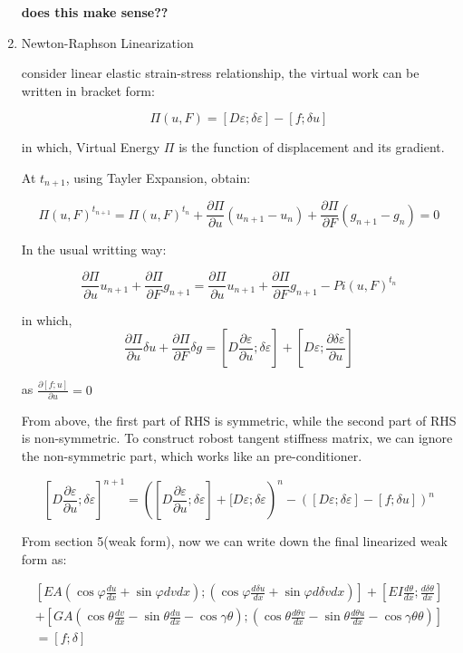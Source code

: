 \documentclass[11pt]{article}
\begin{document}
\begin{enumerate}
\textbf{does this make sense??}
 
\item{Newton-Raphson Linearization} 

consider linear elastic strain-stress relationship, the virtual work can be written in bracket form:

$$ \Pi(u,F) = [D \varepsilon; \delta \varepsilon] - [f; \delta u] $$

in which, Virtual Energy $\Pi$ is the function of displacement and its gradient. 

At $t_{n+1}$, using Tayler Expansion, obtain:

$$\Pi(u,F)^{t_{n+1}} = \Pi(u,F)^{t_n} + \frac {\partial \Pi}{\partial u} (u_{n+1} - u_n)  + \frac {\partial \Pi}{\partial F} ( g_{n+1} - g_n) = 0 $$

In the usual  writting way:

$$\frac {\partial \Pi}{\partial u} u_{n+1}  + \frac {\partial \Pi}{\partial F} g_{n+1} = \frac {\partial \Pi}{\partial u} u_{n+1}  + \frac {\partial \Pi}{\partial F} g_{n+1} - Pi(u,F)^{t_n} $$

in which, 
$$ \frac{\partial \Pi}{\partial u} \delta u +   \frac {\partial \Pi}{\partial F} \delta  g = [D \frac{\partial \varepsilon}{\partial u}; \delta \varepsilon] + [D \varepsilon; \frac{\partial \delta \varepsilon}{\partial u}] $$

as $\frac{\partial[f;u]}{\partial u} = 0 $

From above, the first part of RHS is symmetric, while the second part of RHS is non-symmetric. To construct robost tangent stiffness matrix, we can ignore the non-symmetric part, which works like an pre-conditioner. 
 
$$[D \frac{\partial \varepsilon}{\partial u}; \delta \varepsilon]^{n+1}= ( [D \frac{\partial \varepsilon}{\partial u}; \delta \varepsilon] + [D \varepsilon; \delta \varepsilon)^n - ( [D \varepsilon; \delta \varepsilon] - [f; \delta u])^n $$


From section 5(weak form), now we can write down the final linearized weak form as:

\begin{equation}
\begin{split}
[ EA( \cos \varphi \frac{du}{dx} + \sin \varphi {dv}{dx}); ( \cos \varphi \frac{d \delta u}{dx} + \sin \varphi {d \delta v}{dx})] + [EI \frac{d \theta}{dx};\frac{d \delta \theta}{dx}] \\
 + [ GA ( \cos \theta \frac{dv}{dx} - \sin \theta \frac{du}{dx} - \cos \gamma \theta); ( \cos \theta \frac{d \theta v}{dx} - \sin \theta \frac{d \theta u}{dx} - \cos \gamma \theta \theta)] \\
 = [f; \delta] 
\end{split}
\end{equation}


\end{enumerate}
\end{document}
